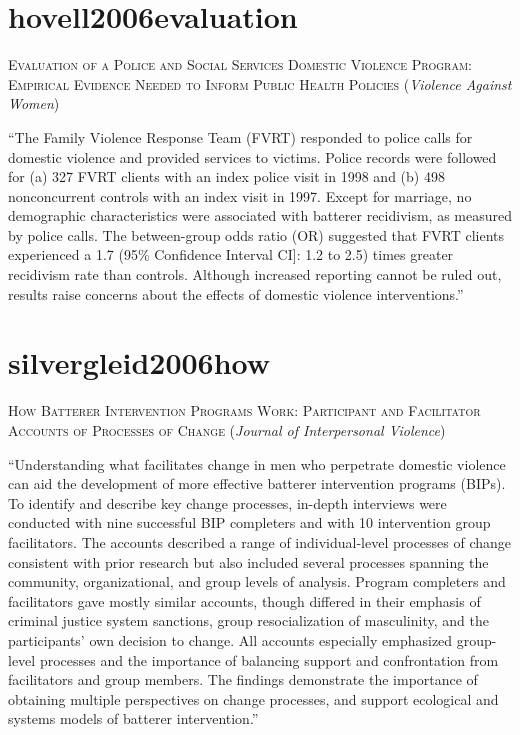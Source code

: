 \documentclass[]{tufte-handout}
\begin{document}
\section{\texorpdfstring{\textcolor[HTML]{5b0057}{hovell2006evaluation}}{}}\label{section-7}

\textsc{\large{Evaluation of a Police and Social Services Domestic Violence Program: Empirical Evidence Needed to Inform Public Health Policies}}
(\emph{Violence Against Women})

``The Family Violence Response Team (FVRT) responded to police calls for
domestic violence and provided services to victims. Police records were
followed for (a) 327 FVRT clients with an index police visit in 1998 and
(b) 498 nonconcurrent controls with an index visit in 1997. Except for
marriage, no demographic characteristics were associated with batterer
recidivism, as measured by police calls. The between-group odds ratio
(OR) suggested that FVRT clients experienced a 1.7 (95\% Confidence
Interval CI{]}: 1.2 to 2.5) times greater recidivism rate than controls.
Although increased reporting cannot be ruled out, results raise concerns
about the effects of domestic violence interventions.''

\section{\texorpdfstring{\textcolor[HTML]{5b0057}{silvergleid2006how}}{}}\label{section-8}

\textsc{\large{How Batterer Intervention Programs Work: Participant and Facilitator Accounts of Processes of Change}}
(\emph{Journal of Interpersonal Violence})

``Understanding what facilitates change in men who perpetrate domestic
violence can aid the development of more effective batterer intervention
programs (BIPs). To identify and describe key change processes, in-depth
interviews were conducted with nine successful BIP completers and with
10 intervention group facilitators. The accounts described a range of
individual-level processes of change consistent with prior research but
also included several processes spanning the community, organizational,
and group levels of analysis. Program completers and facilitators gave
mostly similar accounts, though differed in their emphasis of criminal
justice system sanctions, group resocialization of masculinity, and the
participants' own decision to change. All accounts especially emphasized
group-level processes and the importance of balancing support and
confrontation from facilitators and group members. The findings
demonstrate the importance of obtaining multiple perspectives on change
processes, and support ecological and systems models of batterer
intervention.''
\end{document}

